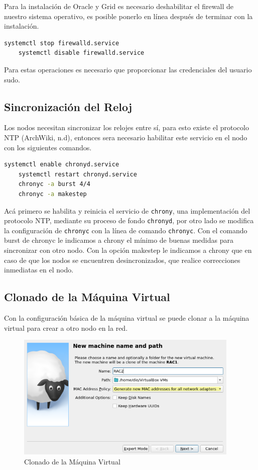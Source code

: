 \documentclass{article}
\begin{document}
Para la instalación de Oracle y Grid es necesario deshabilitar el firewall de nuestro sistema operativo, es posible ponerlo en línea después de terminar con la instalación.

\begin{lstlisting}[style=mystyle,language=bash]
	systemctl stop firewalld.service
	systemctl disable firewalld.service
\end{lstlisting}

Para estas operaciones es necesario que proporcionar las credenciales del usuario sudo.

\subsection{Sincronización del Reloj}

Los nodos necesitan sincronizar los relojes entre sí, para esto existe el protocolo NTP (ArchWiki, n.d), entonces sera necesario habilitar este servicio en el nodo con los siguientes comandos.

\begin{lstlisting}[style=mystyle,language=bash]
	systemctl enable chronyd.service
	systemctl restart chronyd.service
	chronyc -a burst 4/4
	chronyc -a makestep
\end{lstlisting}

Acá primero se habilita y reinicia el servicio de \texttt{chrony}, una implementación del protocolo NTP, mediante su proceso de fondo \texttt{chronyd}, por otro lado se modifica la configuración de \texttt{chronyc} con la línea de comando \texttt{chronyc}.
Con el comando burst de chronyc le indicamos a chrony el mínimo de buenas medidas para sincronizar con otro nodo. Con la opción makestep le indicamos a chrony que en caso de que los nodos se encuentren desincronizados, que realice correcciones inmediatas en el nodo.

\subsection{Clonado de la Máquina Virtual}

Con la configuración básica de la máquina virtual se puede clonar a la máquina virtual para crear a otro nodo en la red.

\begin{figure}[H]
	\begin{center}
		\includegraphics[width=0.95\textwidth]{vm_clone.png}
	\end{center}
	\caption{Clonado de la Máquina Virtual}
\end{figure}
\end{document}
